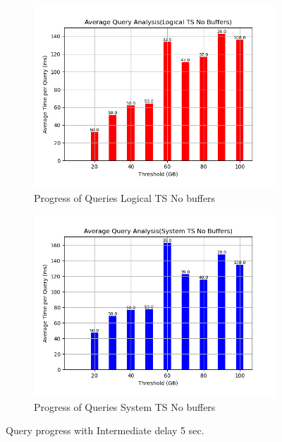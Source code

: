 \begin{figure}
\begin{subfigure}[c]{0.4\textwidth}
		\label{fig:progress-queries-5-system}
	\end{subfigure}
	\begin{subfigure}[c]{0.4\textwidth}
		\includegraphics[width=1\textwidth]   {figures/Experiments/Dynamic/Progress/5/average_query_time_per_batch_version_999777016_10485760_10_delay[5].png}
		\caption{Progress of Queries Logical TS No buffers}
		\label{fig:progress-queries-5-logical-no-buffers}
	\end{subfigure}
	\begin{subfigure}[c]{0.4\textwidth}
		\includegraphics[width=1\textwidth]   {figures/Experiments/Dynamic/Progress/5/average_query_time_per_batch_version_999777017_10485760_10_delay[5].png}
		\caption{Progress of Queries System TS No buffers}
		\label{fig:progress-queries-5-system-no-buffers}
	\end{subfigure}
	\caption{Query progress with Intermediate delay 5 sec.}
	\label{fig:query-progress-delay-5}

\end{figure}

